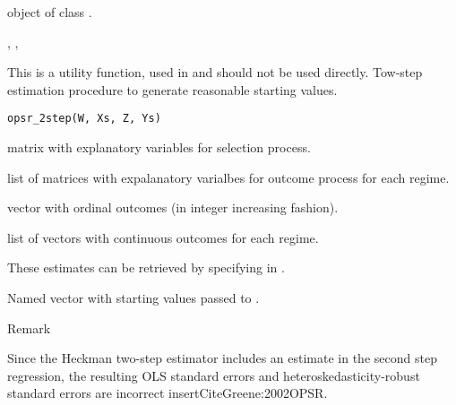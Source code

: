 \documentclass[letterpaper]{book}
\begin{document}
%
\begin{Value}
object of class .
\end{Value}
%
\begin{SeeAlso}
, , 
\end{SeeAlso}
%
\begin{Description}
This is a utility function, used in  and should not be used directly.
Tow-step estimation procedure to generate reasonable starting values.
\end{Description}
%
\begin{Usage}
\begin{verbatim}
opsr_2step(W, Xs, Z, Ys)
\end{verbatim}
\end{Usage}
%
\begin{Arguments}
\begin{ldescription}
\item[\code{W}] matrix with explanatory variables for selection process.

\item[\code{Xs}] list of matrices with expalanatory varialbes for outcome process for each regime.

\item[\code{Z}] vector with ordinal outcomes (in integer increasing fashion).

\item[\code{Ys}] list of vectors with continuous outcomes for each regime.
\end{ldescription}
\end{Arguments}
%
\begin{Details}
These estimates can be retrieved by specifying  in .
\end{Details}
%
\begin{Value}
Named vector with starting values passed to .
\end{Value}
%
\begin{Section}{Remark}

Since the Heckman two-step estimator includes an estimate in the second step
regression, the resulting OLS standard errors and heteroskedasticity-robust
standard errors are incorrect \bsl{}insertCiteGreene:2002OPSR.
\end{Section}
\end{document}
